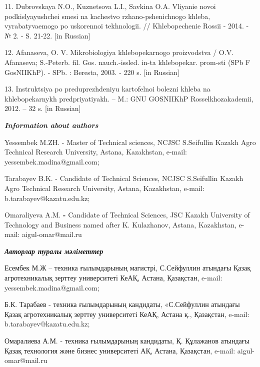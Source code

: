 11. Dubrovskaya N.O., Kuznetsova L.I., Savkina O.A. Vliyanie novoi
podkislyayushchei smesi na kachestvo rzhano-pshenichnogo khleba,
vyrabatyvaemogo po uskorennoi tekhnologii. // Khlebopechenie Rossii -
2014. - № 2. - S. 21-22. {[}in Russian{]}

12. Afanas\textquotesingle eva, O. V. Mikrobiologiya khlebopekarnogo
proizvodstva / O.V. Afanas\textquotesingle eva; S.-Peterb. fil. Gos.
nauch.-issled. in-ta khlebopekar. prom-sti (SPb F GosNIIKhP). - SPb. :
Beresta, 2003. - 220 s. {[}in Russian{]}

13. Instruktsiya po preduprezhdeniyu kartofel\textquotesingle noi
bolezni khleba na khlebopekarnykh predpriyatiyakh. -- M.: GNU GOSNIIKhP
Rossel\textquotesingle khozakademii, 2012. -- 32 s. {[}in Russian{]}

\emph{{\bfseries Information about authors}}

Yessembek M.ZH. - Master of Technical sciences, NCJSC S.Seifullin Kazakh
Agro Technical Research University, Astana, Kazakhstan, e-mail:
yessembek.madina@gmail.com;

Tarabayev B.K. - Candidate of Technical Sciences, NCJSC S.Seifullin
Kazakh Agro Technical Research University, Astana, Kazakhstan, e-mail:
b.tarabayev@kazatu.edu.kz;

Omaraliyeva A.M. {\bfseries -} Candidate of Technical Sciences, JSC Kazakh
University of Technology and Business named after K. Kulazhanov, Astana,
Kazakhstan, e-mail: aigul-omar@mail.ru

\emph{{\bfseries Авторлар туралы мәліметтер}}

Есембек М.Ж -- техника ғылымдарының магистрі, С.Сейфуллин атындағы Қазақ
агротехникалық зерттеу университеті КеАҚ, Астана, Қазақстан, e-mail:
yessembek.madina@gmail.com;

Б.К. Тарабаев - техника ғылымдарының кандидаты, «С.Сейфуллин атындағы
Қазақ агротехникалық зерттеу университеті КеАҚ, Астана қ., Қазақстан,
e-mail: b.tarabayev@kazatu.edu.kz;

Омаралиева А.М. - техника ғылымдарының кандидаты, Қ. Құлажанов атындағы
Қазақ технология және бизнес университеті АҚ, Астана, Қазақстан, e-mail:
aigul-omar@mail.ru